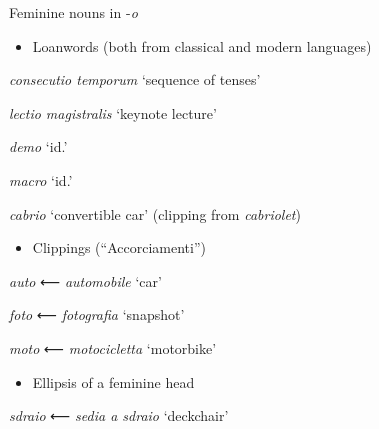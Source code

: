 \documentclass[output=paper]{langscibook}
\begin{document}
          Feminine nouns in \nobreakdash-\textit{o}

\begin{itemize}
\item \begin{styleListParagraph}
Loanwords (both from classical and modern languages)
\end{styleListParagraph}
\end{itemize}
\begin{styleListParagraph}
\textit{consecutio temporum} ‘sequence of tenses’
\end{styleListParagraph}

\begin{styleListParagraph}
\textit{lectio magistralis} ‘keynote lecture’
\end{styleListParagraph}

\begin{styleListParagraph}
\textit{demo} ‘id.’ 
\end{styleListParagraph}

\begin{styleListParagraph}
\textit{macro} ‘id.’
\end{styleListParagraph}

\begin{styleListParagraph}
\textit{cabrio} ‘convertible car’ (clipping from \textit{cabriolet})
\end{styleListParagraph}

\begin{itemize}
\item \begin{styleListParagraph}
Clippings (“Accorciamenti”)
\end{styleListParagraph}
\end{itemize}
\begin{styleListParagraph}
\textit{auto} ⟵ \textit{automobile} ‘car’
\end{styleListParagraph}

\begin{styleListParagraph}
\textit{foto} ⟵ \textit{fotografia} ‘snapshot’ 
\end{styleListParagraph}

\begin{styleListParagraph}
\textit{moto} ⟵ \textit{motocicletta} ‘motorbike’
\end{styleListParagraph}

\begin{itemize}
\item \begin{styleListParagraph}
Ellipsis of a feminine head
\end{styleListParagraph}
\end{itemize}
\begin{styleListParagraph}
\textit{sdraio} ⟵ \textit{sedia a sdraio} ‘deckchair’
\end{styleListParagraph}
\end{document}
